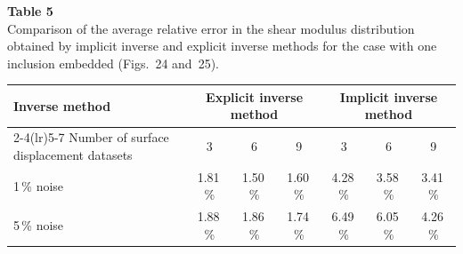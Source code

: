 \documentclass[11pt]{article}
\begin{document}

\newpage


\noindent\textbf{Table 5}\\[0.2em]
{\small Comparison of the average relative error in the shear
modulus distribution obtained by implicit inverse and explicit
inverse methods for the case with one inclusion embedded
(Figs.~24 and~25).}
\vspace{0.3em}

\begin{center}
\small
\begin{tabular}{@{}l ccc ccc@{}}
\toprule
Inverse method
  & \multicolumn{3}{c}{Explicit inverse method}
  & \multicolumn{3}{c}{Implicit inverse method} \\
\cmidrule(lr){2-4}\cmidrule(lr){5-7}
Number of surface displacement datasets
  & 3 & 6 & 9 & 3 & 6 & 9 \\
\midrule
1\,\% noise & 1.81\,\% & 1.50\,\% & 1.60\,\% & 4.28\,\% & 3.58\,\% & 3.41\,\% \\
5\,\% noise & 1.88\,\% & 1.86\,\% & 1.74\,\% & 6.49\,\% & 6.05\,\% & 4.26\,\% \\
\bottomrule
\end{tabular}
\end{center}

\vspace{1em}
\end{document}

